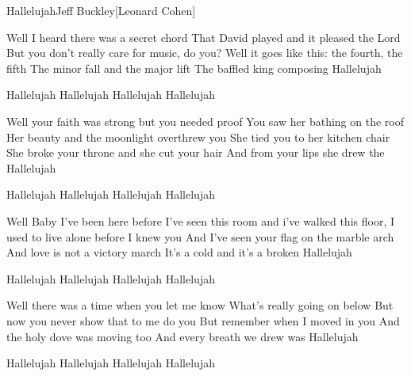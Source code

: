 \begin{Song}{Hallelujah}{Jeff Buckley}[Leonard Cohen]
\begin{multicols}{2}

\begin{Verse}
Well I heard there was a secret chord
That David played and it pleased the Lord
But you don't really care for music, do you?
Well it goes like this: the fourth, the fifth
The minor fall and the major lift
The baffled king composing Hallelujah
\end{Verse}
\espaceInterStrophe

\begin{Chorus}
Hallelujah Hallelujah Hallelujah Hallelujah
\end{Chorus}
\espaceInterStrophe

\begin{Verse}
Well your faith was strong but you needed proof
You saw her bathing on the roof
Her beauty and the moonlight overthrew you
She tied you to her kitchen chair
She broke your throne and she cut your hair
And from your lips she drew the Hallelujah
\end{Verse}
\espaceInterStrophe

\begin{Chorus}
Hallelujah Hallelujah Hallelujah Hallelujah
\end{Chorus}
\espaceInterStrophe

\begin{Verse}
Well Baby I've been here before
I've seen this room and i've walked this floor,
I used to live alone before I knew you
And I've seen your flag on the marble arch
And love is not a victory march
It's a cold and it's a broken Hallelujah
\end{Verse}
\espaceInterStrophe

\begin{Chorus}
Hallelujah Hallelujah Hallelujah Hallelujah
\end{Chorus}
\vfill
\columnbreak

\begin{Verse}
Well there was a time when you let me know
What's really going on below
But now you never show that to me do you
But remember when I moved in you
And the holy dove was moving too
And every breath we drew was Hallelujah
\end{Verse}
\espaceInterStrophe

\begin{Chorus}
Hallelujah Hallelujah Hallelujah Hallelujah
\end{Chorus}
\espaceInterStrophe


\end{multicols}
\end{Song}
